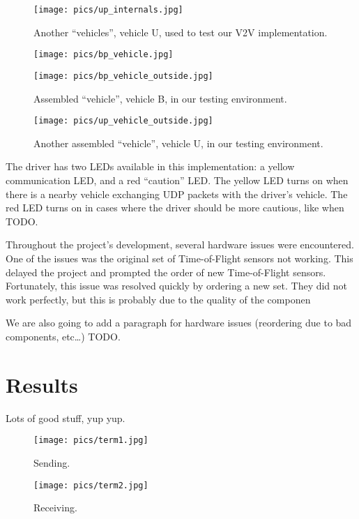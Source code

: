 \documentclass[conference]{IEEEtran}
\begin{document}
\begin{figure}[htbp]
\centerline{\texttt{[image: pics/up\_internals.jpg]}}
\caption{Another ``vehicles'', vehicle U, used to test our V2V implementation.}
\label{vehicle_up}
\end{figure}

\begin{figure}[htbp]
\centerline{\texttt{[image: pics/bp\_vehicle.jpg]}}
\centerline{\texttt{[image: pics/bp\_vehicle\_outside.jpg]}}
\caption{Assembled ``vehicle'', vehicle B, in our testing environment.}
\label{bp_outside}
\end{figure}

\begin{figure}[htbp]
\centerline{\texttt{[image: pics/up\_vehicle\_outside.jpg]}}
\caption{Another assembled ``vehicle'', vehicle U, in our testing environment.}
\label{up_outside}
\end{figure}

The driver has two LEDs available in this implementation: a yellow communication
LED, and a red ``caution'' LED. The yellow LED turns on when there is a nearby
vehicle exchanging UDP packets with the driver's vehicle. The red LED turns on
in cases where the driver should be more cautious, like when TODO.

Throughout the project's development, several hardware issues were encountered.
One of the issues was the original set of Time-of-Flight sensors not working.
This delayed the project and prompted the order of new Time-of-Flight sensors.
Fortunately, this issue was resolved quickly by ordering a new set. They did not
work perfectly, but this is probably due to the quality of the componen

We are also going to add a paragraph for hardware issues (reordering due to bad
components, etc…) TODO.

\section{Results}
Lots of good stuff, yup yup.

\begin{figure}[htbp]
\centerline{\texttt{[image: pics/term1.jpg]}}
\caption{Sending.}
\label{term1}
\end{figure}

\begin{figure}[htbp]
\centerline{\texttt{[image: pics/term2.jpg]}}
\caption{Receiving.}
\label{term1}
\end{figure}
\end{document}
